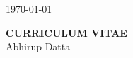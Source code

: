 \documentclass[12pt]{article}
\begin{document}
\hfill \today

\begin{center}
{\bf CURRICULUM VITAE}\\
Abhirup Datta\\[3mm]
\end{center}

%
%
%
\end{document}
